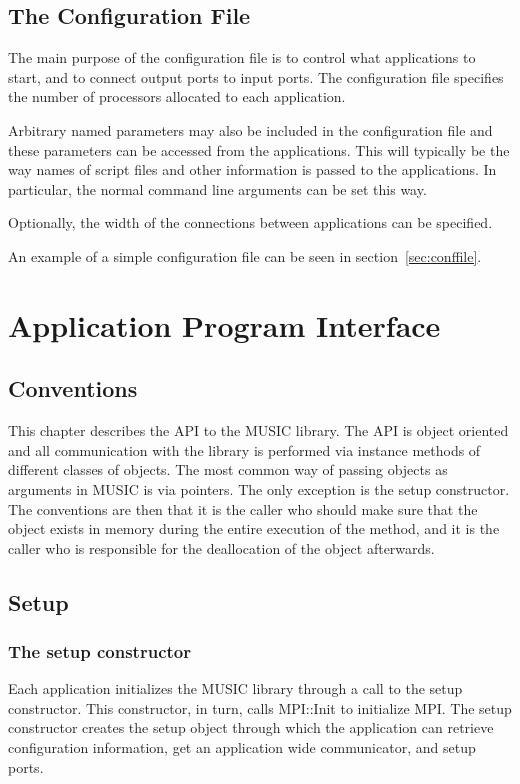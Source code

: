 \documentclass[a4paper]{report}
\begin{document}
\section{The Configuration File}

The main purpose of the configuration file is to control what
applications to start, and to connect output ports to input ports.
The configuration file specifies the number of processors allocated to
each application.

Arbitrary named parameters may also be included in the configuration
file and these parameters can be accessed from the applications.  This
will typically be the way names of script files and other information
is passed to the applications.  In particular, the normal command line
arguments can be set this way.

Optionally, the width of the connections between applications can be
specified.

An example of a simple configuration file can be seen in
section~\ref{sec:conffile}.


\chapter{Application Program Interface}

\section{Conventions}

This chapter describes the API to the MUSIC library.  The API is
object oriented and all communication with the library is performed
via instance methods of different classes of objects.  The most common
way of passing objects as arguments in MUSIC is via pointers.  The
only exception is the setup constructor.  The conventions are then
that it is the caller who should make sure that the object exists in
memory during the entire execution of the method, and it is the caller
who is responsible for the deallocation of the object afterwards.

\section{Setup}

\subsection{The setup constructor}

Each application initializes the MUSIC library through a call to the
setup constructor.  This constructor, in turn, calls
MPI::Init to initialize
MPI.  The setup constructor creates the setup
object through which the application can retrieve configuration
information, get an application wide communicator, and setup ports.
\end{document}
